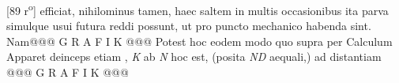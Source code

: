 [89 r\textsuperscript{o}]  efficiat, nihilominus tamen, haec saltem in multis occasionibus  ita parva simulque usui futura reddi possunt, ut pro puncto mechanico\protect{} habenda sint. Nam\pend \pstart @@@ G R A F I K @@@%
                      Potest hoc eodem modo quo supra per Calculum   Apparet deinceps etiam , \textit{K} ab \textit{N} hoc est,  (posita \textit{ND} aequali,) ad distantiam @@@ G R A F I K @@@%
